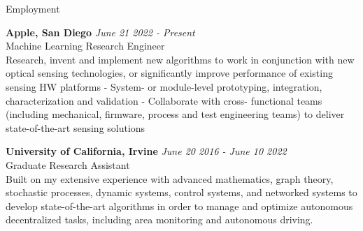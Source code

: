 \begin{rSection}{Employment}


{\bf Apple, San Diego} \hfill {\em June 21 2022 - Present} 
\\ Machine Learning Research Engineer\hfill 
\\ Research, invent and implement new algorithms to work in conjunction with new optical sensing technologies, or significantly improve performance of existing sensing HW platforms - System- or module-level prototyping, integration, characterization and validation - Collaborate with cross- functional teams (including mechanical, firmware, process and test engineering teams) to deliver state-of-the-art sensing solutions\hfill 


{\bf University of California, Irvine} \hfill {\em June 20 2016 - June 10 2022} 
\\ Graduate Research Assistant\hfill
\\ Built on my extensive experience with advanced
mathematics, graph theory, stochastic
processes, dynamic systems, control systems, and networked systems to develop state-of-the-art algorithms in order to manage and optimize
autonomous decentralized tasks, including area monitoring and autonomous driving.\hfill


\end{rSection}